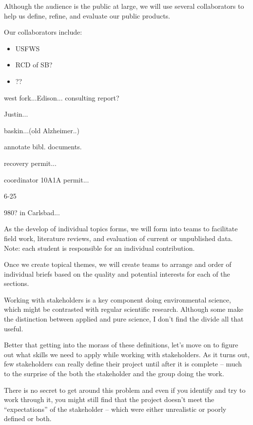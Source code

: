 \documentclass{tufte-handout}\usepackage[]{graphicx}\usepackage[]{color}
\begin{document}
Although the audience is the public at large, we will use several collaborators to help us define, refine, and evaluate our public products.  

Our collaborators include: 

\begin{itemize}
  \item USFWS
  \item RCD of SB?
  \item ??
\end{itemize}

west fork...Edison... consulting report?



Justin...

baskin...(old Alzheimer..)

annotate bibl. documents.

recovery permit...

coordinator 10A1A permit...

6-25


980? in Carlsbad...

As the develop of individual topics forms, we will form into teams to facilitate field work, literature reviews, and evaluation of current or unpublished data. Note: each student is responsible for an individual contribution. 

Once we create topical themes, we will create teams to arrange and order of  individual briefs based on the quality and potential interests for each of the sections.  

Working with stakeholders is a key component doing environmental science, which might be contrasted with regular scientific research. Although some make the distinction between applied and pure science, I don't find the divide all that useful. 

Better that getting into the morass of these definitions, let's move on to figure out what skills we need to apply while working with stakeholders. As it turns out, few stakeholders can really define their project until after it is complete -- much to the surprise of the both the stakeholder and the group doing the work. 

There is no secret to get around this problem and even if you identify and try to work through it, you might still find that the project doesn't meet the ``expectations'' of the stakeholder -- which were either unrealistic or poorly defined or both.
\end{document}
